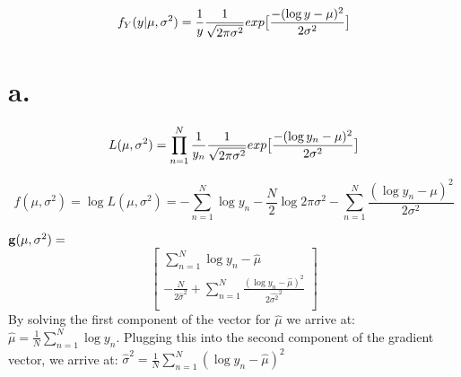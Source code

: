 \documentclass{paper}
\begin{document}
$$f_Y ( y | \mu, \sigma^2 ) = \frac{1}{y} \frac{1}{\sqrt{2 \pi \sigma^2} } exp  \big{[} \frac{ - ( \log{y} - \mu )^2 }{ 2\sigma^2 } \big{]}$$

\section*{a.}
$$L(\mu,\sigma^2) = \prod\limits_{n=1}^{N} \frac{1}{y_n} \frac{1}{\sqrt{2 \pi \sigma^2} } exp  \big{[} \frac{ - ( \log{y_n} - \mu )^2 }{ 2\sigma^2 } \big{]}$$

$$f( \mu, \sigma^2 ) = \log{ L(\mu,\sigma^2)} = -\sum_{n=1}^N \log{ y_n} - \frac{N}{2} \log{ 2 \pi \sigma^2 } -\sum_{n=1}^N \frac{ ( \log{ y_n } - \mu )^2 }{ 2 \sigma^2 }$$

$\bold{ g}( \mu, \sigma^2 ) = $\[
	\left[ {\begin{array}{c}
	\sum_{n=1}^N \log{ y_n } - \hat{\mu} \\
	-\frac{ N } { 2 \hat{\sigma}^2} + \sum_{n=1}^N \frac{ ( \log{y_n} - \hat{\mu})^2 }{ 2 {\hat{\sigma^2}}^2 } \\
	\end{array} } \right]
\]
By solving the first component of the vector for $\hat{\mu}$ we arrive at: $\hat{\mu} = \frac{1}{N} \sum_{n=1}^N \log{ y_n }$. Plugging this into the second component of the gradient vector, we arrive at:
$\hat{\sigma}^2 = \frac{1}{N} \sum_{n=1}^N ( \log{ y_n } - \hat{ \mu } )^2$
\end{document}
